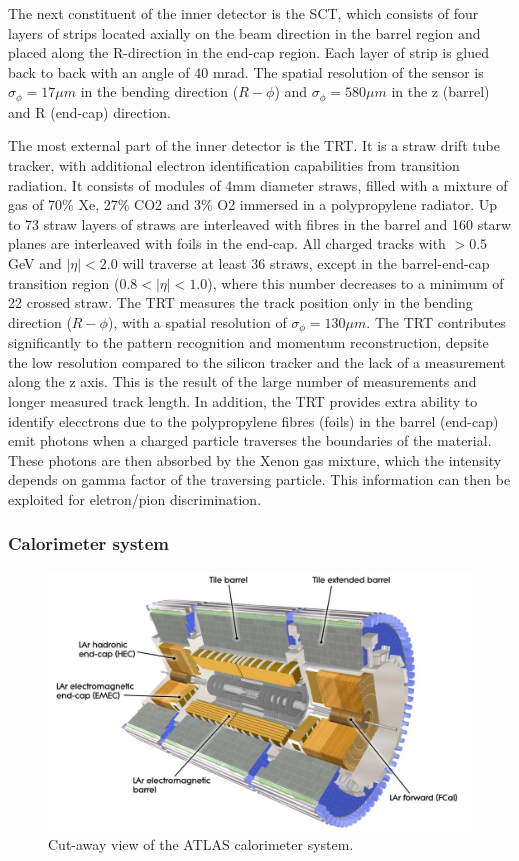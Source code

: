 \documentclass[letterpaper,12pt]{article}
\begin{document}
	The next constituent of the inner detector is the SCT, 
	which consists of four layers of strips located axially on the 
	beam direction in the barrel region and placed along the
	R-direction in the end-cap region. 
	Each layer of strip is glued back to back with an angle of
	40 mrad. The spatial resolution of the sensor is 
	$\sigma_\phi = 17\mu m$ in the bending direction ($R-\phi$)
	and $\sigma_\phi = 580\mu m$ in the z (barrel) and R (end-cap) direction. 

	The most external part of the inner detector is the TRT. 
	It is a straw drift tube tracker, with additional electron identification
	capabilities from transition radiation. It consists of
	modules of 4mm diameter straws, filled with a mixture of gas of
	70\% Xe, 27\% CO2 and 3\% O2 immersed in a polypropylene radiator.
	Up to 73 straw layers of straws are interleaved with fibres in the barrel
	and 160 starw planes are interleaved with foils in the end-cap. 
	All charged tracks with \pt $> 0.5$ GeV and $|\eta| < 2.0$ will traverse 
	at least 36 straws, except in the
	barrel-end-cap transition region ($0.8 < |\eta|< 1.0$), 
	where this number decreases to a minimum of 22 crossed straw.
	The TRT measures the track position only in the bending direction
	($R-\phi$), with a spatial resolution of $\sigma_\phi = 130 \mu m$.
	The TRT contributes significantly to the pattern recognition and 
	momentum reconstruction, depsite the low resolution compared to the 
	silicon tracker and the lack of a measurement along the z axis. 
	This is the result of the large number of measurements and longer
	measured track length. In addition, the TRT provides extra ability to 
	identify elecctrons due to the polypropylene fibres (foils) in the barrel
	(end-cap) emit photons when a charged particle traverses the boundaries of
	the material. These photons are then absorbed by the Xenon gas mixture, which
	the intensity depends on gamma factor of the traversing particle. 
	This information can then be exploited for eletron/pion discrimination.

\subsubsection{Calorimeter system}



	\begin{figure}[]
		\begin{centering}	
		\includegraphics[width=.4\textwidth]{Detector_plots/calo.png}
		\caption{Cut-away view of the ATLAS calorimeter system.}
		\label{fig:calo}
		\end{centering}
	\end{figure}
\end{document}
